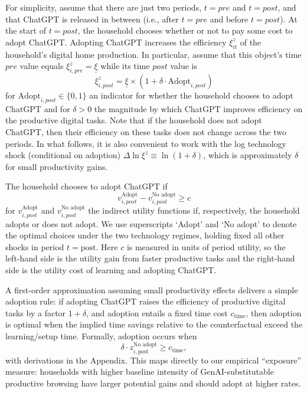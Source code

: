\documentclass[12pt]{article}
\begin{document}
For simplicity, assume that there are just two periods, $t = pre$ and $t = post$, and that ChatGPT is released in between (i.e., after $t=pre$ and before $t=post$). At the start of $t = post$, the household chooses whether or not to pay some cost to adopt ChatGPT. Adopting ChatGPT increases the efficiency $\xi_{it}^{z}$ of the household's digital home production. In particular, assume that this object's time $pre$ value equals $ \xi_{i,pre}^{z} = \underline{\xi}$
while its time $post$ value is 
\begin{equation}
    \xi_{i,post}^{z} = \underline{\xi} \times \left( 1 +  \delta \cdot \text{Adopt}_{i,post} \right)
\end{equation}
for $\text{Adopt}_{i,post} \in \{0,1\}$ an indicator for whether the household chooses to adopt ChatGPT and for $\delta > 0$ the magnitude by which ChatGPT improves efficiency on the productive digital tasks. Note that if the household does not adopt ChatGPT, then their efficiency on these tasks does not change across the two periods. In what follows, it is also convenient to work with the log technology shock (conditional on adoption)
$\Delta \ln \xi^z \equiv \ln(1 + \delta)$, which is approximately $\delta$
for small productivity gains.

The household chooses to adopt ChatGPT if 
\begin{equation}
    v_{i,post}^{\text{Adopt}} - v_{i,post}^{\text{No adopt}} \ge c 
\end{equation}
for $ v_{i,post}^{\text{Adopt}}$ and $ v_{i,post}^{\text{No adopt}} $ the indirect utility functions if, respectively, the household adopts or does not adopt. We use superscripts `Adopt' and `No adopt' to denote the optimal choices under the two technology regimes, holding fixed all other shocks in period \(t=\text{post}\). Here $c$ is measured in units of period utility, so the left‑hand side is the utility gain from faster productive tasks and the right‑hand side is the utility cost of learning and adopting ChatGPT.

A first-order approximation assuming small productivity effects delivers a simple adoption rule: if adopting ChatGPT raises the efficiency
of productive digital tasks by a factor $1 + \delta$, and adoption entails a fixed time cost $c_{\text{time}}$,
then adoption is optimal when the implied time savings relative to the counterfactual exceed the learning/setup time. Formally,
adoption occurs when
\[
\delta \cdot z^{\text{No adopt}}_{i,\text{post}} \geq c_{\text{time}},
\]
with derivations in the Appendix. This maps directly to our empirical ``exposure'' measure: households
with higher baseline intensity of GenAI-substitutable productive browsing have larger potential gains
and should adopt at higher rates.
\end{document}
